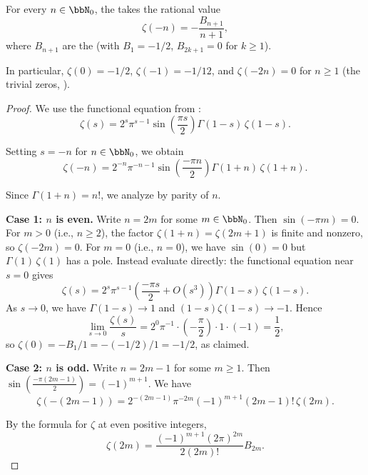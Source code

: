 \begin{corollary} \label{corollary:values_of_riemann_zeta_at_non_positive_integers}
For every $n \in \bbN_0$, the  takes the rational value
$$
\boxed{ \zeta(-n) = -\frac{B_{n+1}}{n+1}, }
$$
where $B_{n+1}$ are the  (with $B_1 = -1/2$, $B_{2k+1} = 0$ for $k \ge 1$).

In particular, $\zeta(0) = -1/2$, $\zeta(-1) = -1/12$, and $\zeta(-2n) = 0$ for $n \ge 1$ (the trivial zeros, ).
\end{corollary}

\begin{proof}
    We use the functional equation from :
    $$\zeta(s) = 2^s \pi^{s-1} \sin\!\left(\frac{\pi s}{2}\right) \Gamma(1-s)\, \zeta(1-s).$$

    Setting $s = -n$ for $n \in \bbN_0$, we obtain
    $$\zeta(-n) = 2^{-n} \pi^{-n-1} \sin\!\left(\frac{-\pi n}{2}\right) \Gamma(1+n)\, \zeta(1+n).$$

    Since $\Gamma(1+n) = n!$, we analyze by parity of $n$.

    \textbf{Case 1: $n$ is even.} Write $n = 2m$ for some $m \in \bbN_0$. Then $\sin(-\pi m) = 0$. For $m > 0$ (i.e., $n \geq 2$), the factor $\zeta(1+n) = \zeta(2m+1)$ is finite and nonzero, so $\zeta(-2m) = 0$. For $m = 0$ (i.e., $n = 0$), we have $\sin(0) = 0$ but $\Gamma(1)\,\zeta(1)$ has a pole. Instead evaluate directly: the functional equation near $s=0$ gives
    $$\zeta(s) = 2^s \pi^{s-1} \left(\frac{-\pi s}{2} + O(s^3)\right) \Gamma(1-s)\, \zeta(1-s).$$
    As $s \to 0$, we have $\Gamma(1-s) \to 1$ and $(1-s)\zeta(1-s) \to -1$. Hence
    $$\lim_{s \to 0} \frac{\zeta(s)}{s} = 2^0 \pi^{-1} \cdot \left(-\frac{\pi}{2}\right) \cdot 1 \cdot (-1) = \frac{1}{2},$$
    so $\zeta(0) = -B_1/1 = -(-1/2)/1 = -1/2$, as claimed.

    \textbf{Case 2: $n$ is odd.} Write $n = 2m-1$ for some $m \geq 1$. Then $\sin\left(\frac{-\pi(2m-1)}{2}\right) = (-1)^{m+1}$. We have
    $$\zeta(-(2m-1)) = 2^{-(2m-1)} \pi^{-2m} (-1)^{m+1} (2m-1)! \, \zeta(2m).$$

    By the formula for $\zeta$ at even positive integers,
    $$\zeta(2m) = \frac{(-1)^{m+1}(2\pi)^{2m}}{2(2m)!} B_{2m}.$$


\end{proof}

